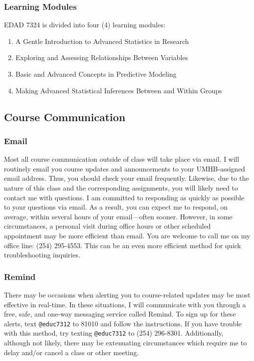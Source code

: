 \documentclass[
]{article}
\providecommand{\tightlist}{%
  \setlength{\itemsep}{0pt}\setlength{\parskip}{0pt}}
\begin{document}
\subsubsection{Learning Modules}

EDAD 7324 is divided into four (4) learning modules:

\begin{enumerate}
\def\labelenumi{\arabic{enumi}.}
\tightlist
\item
  A Gentle Introduction to Advanced Statistics in Research
\item
  Exploring and Assessing Relationships Between Variables
\item
  Basic and Advanced Concepts in Predictive Modeling
\item
  Making Advanced Statistical Inferences Between and Within Groups
\end{enumerate}

\subsection{Course Communication}

\subsubsection{Email}

Most all course communication outside of class will take place via
email. I will routinely email you course updates and announcements to
your UMHB-assigned email address. Thus, you should check your email
frequently. Likewise, due to the nature of this class and the
corresponding assignments, you will likely need to contact me with
questions. I am committed to responding as quickly as possible to your
questions via email. As a result, you can expect me to respond, on
average, within several hours of your email---often sooner. However, in
some circumstances, a personal visit during office hours or other
scheduled appointment may be more efficient than email. You are welcome
to call me on my office line: (254) 295-4553. This can be an even more
efficient method for quick troubleshooting inquiries.

\subsubsection{Remind}

There may be occasions when alerting you to course-related updates may
be most effective in real-time. In these situations, I will communicate
with you through a free, safe, and one-way messaging service called
Remind. To sign up for these alerts, text \texttt{@educ7312} to 81010
and follow the instructions. If you have trouble with this method, try
texting \texttt{@educ7312} to (254) 296-8301. Additionally, although not
likely, there may be extenuating circumstances which require me to delay
and/or cancel a class or other meeting.
\end{document}
